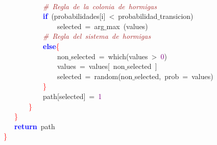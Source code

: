 \mbox{} \\
\mbox{}\ \ \ \ \ \ \ \ \ \ \ \ \textit{\textcolor{Brown}{\#\ Regla\ de\ la\ colonia\ de\ hormigas}} \\
\mbox{}\ \ \ \ \ \ \ \ \ \ \ \ \textbf{\textcolor{Blue}{if}}\ \textcolor{BrickRed}{(}probabilidades\textcolor{BrickRed}{[}i\textcolor{BrickRed}{]}\ \textcolor{BrickRed}{\textless{}}\ probabilidad$\_$transicion\textcolor{BrickRed}{)} \\
\mbox{}\ \ \ \ \ \ \ \ \ \ \ \ \ \ \ \ selected\ \textcolor{BrickRed}{=}\ arg$\_$max\ \textcolor{BrickRed}{(}values\textcolor{BrickRed}{)} \\
\mbox{}\ \ \ \ \ \ \ \ \ \ \ \ \textit{\textcolor{Brown}{\#\ Regla\ del\ sistema\ de\ hormigas}} \\
\mbox{}\ \ \ \ \ \ \ \ \ \ \ \ \textbf{\textcolor{Blue}{else}}\textcolor{Red}{\{} \\
\mbox{}\ \ \ \ \ \ \ \ \ \ \ \ \ \ \ \ non$\_$selected\ \textcolor{BrickRed}{=}\ which\textcolor{BrickRed}{(}values\ \textcolor{BrickRed}{\textgreater{}}\ \textcolor{Purple}{0}\textcolor{BrickRed}{)} \\
\mbox{}\ \ \ \ \ \ \ \ \ \ \ \ \ \ \ \ values\ \textcolor{BrickRed}{=}\ values\textcolor{BrickRed}{[}\ non$\_$selected\ \textcolor{BrickRed}{]} \\
\mbox{}\ \ \ \ \ \ \ \ \ \ \ \ \ \ \ \ selected\ \textcolor{BrickRed}{=}\ random\textcolor{BrickRed}{(}non$\_$selected\textcolor{BrickRed}{,}\ prob\ \textcolor{BrickRed}{=}\ values\textcolor{BrickRed}{)} \\
\mbox{}\ \ \ \ \ \ \ \ \ \ \ \ \textcolor{Red}{\}} \\
\mbox{}\ \ \ \ \ \ \ \ \ \ \ \ path\textcolor{BrickRed}{[}selected\textcolor{BrickRed}{]}\ \textcolor{BrickRed}{=}\ \textcolor{Purple}{1} \\
\mbox{}\ \ \ \ \ \ \ \ \textcolor{Red}{\}} \\
\mbox{}\ \ \ \ \textcolor{Red}{\}} \\
\mbox{}\ \ \ \ \textbf{\textcolor{Blue}{return}}\ path \\
\mbox{}\ \textcolor{Red}{\}} \\
\mbox{}
